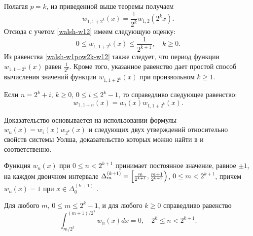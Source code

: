 Полагая $p=k$, из приведенной выше теоремы получаем
\begin{equation}\label{walsh-w1pow2k-w12}
w_{1,1+2^k}(x)=\frac{1}{2^k}w_{1,2}(2^k x).
\end{equation}
Отсюда с учетом \eqref{walsh-w12} имеем следующую оценку:
\begin{equation}\label{walsh-w12k-est}
0 \le w_{1,1+2^k}(x) \le \frac{1}{2^{k+1}}, \quad k \ge 0.
\end{equation}
Из равенства \eqref{walsh-w1pow2k-w12} также следует, что период функции $w_{1,1+2^k}(x)$ равен $\frac{1}{2^k}$.
Кроме того, указанное равенство дает простой способ вычисления значений функции $w_{1,1+2^k}(x)$ при произвольном $k \ge 1$.

\begin{theorem}\label{walsh-st-w1n-w12k}
	Если $n=2^k+i$, $k \ge 0$, $0 \le i \le 2^k-1$, то справедливо следующее равенство:
	\begin{equation*}
	w_{1,1+n}(x)=w_i(x)w_{1,1+2^k}(x).
	\end{equation*}
\end{theorem}
Доказательство основывается на использовании формулы $w_n(x)=w_i(x)w_{2^k}(x)$ \cite[с. 10, формула (1.1.5)]{walsh-GolubovBook} и следующих двух утверждений относительно свойств системы Уолша, доказательство которых можно найти в \cite[с. 11, теорема 1.1.3]{walsh-GolubovBook} и \cite[с. 11, теорема 1.1.4]{walsh-GolubovBook} соответственно.
\begin{statement}\label{walsh-w-const-on-delta}
	Функция $w_n(x)$ при $0 \le n < 2^{k+1}$ принимает постоянное значение, равное $\pm 1$, на каждом двоичном интервале 
	$\Delta_m^{(k+1)}=\Bigl[\frac{m}{2^{k+1}},\frac{m+1}{2^{k+1}}\Bigr)$, $0 \le m < 2^{k+1}$, причем $w_n(x)=1$ при $x \in \Delta_0^{(k+1)}$ .
\end{statement}
\begin{statement}\label{walsh-int-deltak-zero}
	Для любого $m$, $0 \le m \le 2^k-1$, и для любого $k \ge 0$ справедливо равенство 
	\begin{equation*}
	\int_{m/2^k}^{(m+1)/2^k}
	w_n(x)dx = 0, \quad 2^k \le n < 2^{k+1}.
	\end{equation*}
\end{statement}








